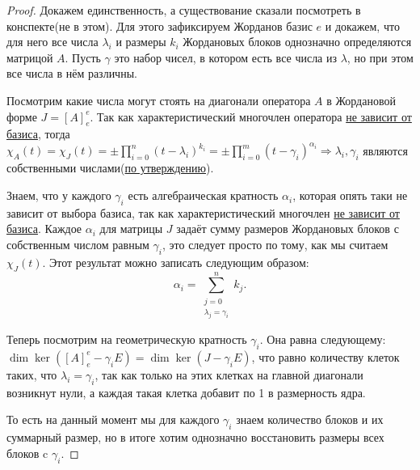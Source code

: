 \begin{proof}
    Докажем единственность, а существование сказали посмотреть в конспекте(не в этом). 
    Для этого зафиксируем Жорданов базис $e$ и докажем, что для него все числа 
    $\lambda_i$ и размеры $k_i$ Жордановых блоков однозначно определяются матрицой $A$.
    Пусть $\gamma$ это набор чисел, в котором есть все числа из $\lambda$, но при этом
    все числа в нём различны.

    Посмотрим какие числа могут стоять на диагонали оператора $A$ в Жордановой форме $J = [A]^e_e$.
    Так как характеристический многочлен оператора 
    \hyperref[rem:Характеристический многочлен не зависит от базиса]{не зависит от базиса}, тогда
    $\chi_A(t) = \chi_J(t) = \pm\prod\limits_{i=0}^{n}{(t-\lambda_i)^{k_i}}=
    \pm\prod\limits_{i=0}^{m}{(t-\gamma_i)^{\alpha_i}} \Rightarrow \lambda_i, \gamma_i$
    являются собственными числами(\hyperref[stm:Критерий для собственного числа]{по утверждению}).


    Знаем, что у каждого $\gamma_i$ есть алгебраическая кратность $\alpha_i$, которая опять таки
    не зависит от выбора базиса, так как характеристический многочлен
    \hyperref[rem:Характеристический многочлен не зависит от базиса]{не зависит от базиса}.
    Каждое $\alpha_i$ для матрицы $J$ задаёт сумму размеров Жордановых блоков с собственным 
    числом равным $\gamma_i$,
    это следует просто по тому, как мы считаем $\chi_J(t)$. Этот результат можно записать
    следующим образом: 
    \[
        \alpha_i = \sum\limits_{\substack{j=0\\\lambda_j = \gamma_i}}^{n} k_j
    .\]

    Теперь посмотрим на геометрическую кратность $\gamma_i$. Она равна следующему:
    $\dim \ker \left([A]^e_e - \gamma_i E\right) = \dim \ker (J - \gamma_i E)$, 
    что равно количеству клеток таких, что $\lambda_i = \gamma_i$,
    так как только на этих клетках на главной диагонали возникнут нули, а каждая такая клетка
    добавит по 1 в размерность ядра.

    То есть на данный момент мы для каждого $\gamma_i$ знаем количество блоков и их суммарный
    размер, но в итоге хотим однозначно восстановить размеры всех блоков c $\gamma_i$.


\end{proof}
